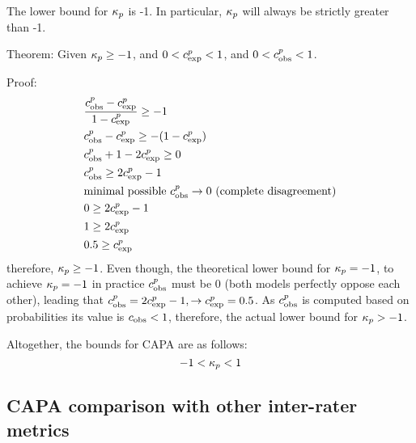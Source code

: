 The lower bound for $\kappa_{p}$ is -1. In particular, $\kappa_{p}$ will always be strictly greater than -1. 

Theorem: Given $\kappa_{p} \geq -1$, and $ 0 < c_{\text{exp}}^{p} < 1 $, and $ 0 < c_{\text{obs}}^{p} < 1 $.

Proof: 
\begin{align*}
    & \frac{c_{\text{obs}}^{p} - c_{\text{exp}}^{p}}{1-c_{\text{exp}}^{p}} \geq -1 \\
    & c_{\text{obs}}^{p} - c_{\text{exp}}^{p} \geq -(1-c_{\text{exp}}^{p}) \\
    & c_{\text{obs}}^{p} + 1 -2c_{\text{exp}}^{p} \geq 0 \\ 
    & c_{\text{obs}}^{p} \geq 2c_{\text{exp}}^{p} - 1 \\
    & \text{minimal possible } c_{\text{obs}}^{p} \rightarrow 0 \text{ (complete disagreement)} \\
    & 0 \geq 2c_{\text{exp}}^{p} - 1 \\ 
    & 1 \geq 2c_{\text{exp}}^{p} \\
    & 0.5 \geq c_{\text{exp}}^{p} \\ 
\end{align*}
therefore, $\kappa_{p} \geq -1$. Even though, the theoretical lower bound for $\kappa_{p}=-1$, to achieve $\kappa_{p}=-1$ in practice $c_{\text{obs}}^{p}$ must be 0 (both models perfectly oppose each other), leading that $c_{\text{obs}}^{p} = 2c_{\text{exp}}^{p} - 1, \rightarrow c_{\text{exp}}^{p}=0.5$. As $c_{\text{obs}}^{p}$ is computed based on probabilities its value is $c_{\text{obs}} < 1$, therefore, the actual lower bound for $\kappa_{p} > -1$. 

Altogether, the bounds for CAPA are as follows:
\begin{equation}
    -1 < \kappa_{p} < 1
\end{equation}


\subsection{CAPA comparison with other inter-rater metrics}
\label{sec:metric_comparison}

